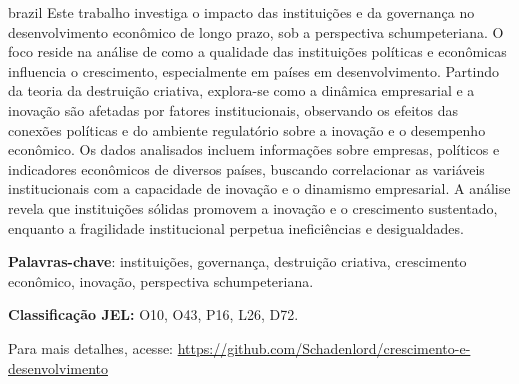 \documentclass[
	article,
	12pt,
	oneside,
	a4paper,
	english,
	brazil, %
	sumario=tradicional
]{abntex2}
\begin{document}
\renewcommand{\resumoname}{Resumo}
\begin{resumoumacoluna}
\begin{otherlanguage*}{brazil}
    \noindent 
    Este trabalho investiga o impacto das instituições e da governança no desenvolvimento econômico de longo prazo, sob a perspectiva schumpeteriana. O foco reside na análise de como a qualidade das instituições políticas e econômicas influencia o crescimento, especialmente em países em desenvolvimento. Partindo da teoria da destruição criativa, explora-se como a dinâmica empresarial e a inovação são afetadas por fatores institucionais, observando os efeitos das conexões políticas e do ambiente regulatório sobre a inovação e o desempenho econômico. Os dados analisados incluem informações sobre empresas, políticos e indicadores econômicos de diversos países, buscando correlacionar as variáveis institucionais com a capacidade de inovação e o dinamismo empresarial. A análise revela que instituições sólidas promovem a inovação e o crescimento sustentado, enquanto a fragilidade institucional perpetua ineficiências e desigualdades.
    
    \textbf{Palavras-chave}: instituições, governança, destruição criativa, crescimento econômico, inovação, perspectiva schumpeteriana.
    
    \textbf{Classificação JEL:} O10, O43, P16, L26, D72.

	   Para mais detalhes, acesse: \url{https://github.com/Schadenlord/crescimento-e-desenvolvimento}

 \end{otherlanguage*}  
\end{resumoumacoluna}

\newpage


\textual



\renewcommand{\refname}{Referências}


\end{document}
